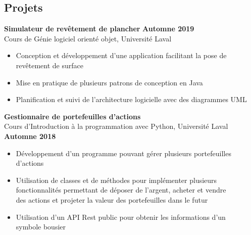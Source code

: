 \documentclass[margin,line]{resume}
\begin{document}
\begin{resume}
    \section{\mysidestyle Projets}
    \textbf{Simulateur de revêtement de plancher} \hfill \textbf{Automne 2019}
    \vspace{2mm}\\\vspace{1mm}
    Cours de Génie logiciel orienté objet, Université Laval
    \begin{itemize}
        \item Conception et développement d'une application facilitant la pose de
        \\    revêtement de surface
        \item Mise en pratique de plusieurs patrons de conception en Java
        \item Planification et suivi de l'architecture logicielle avec des diagrammes UML
    \end{itemize}
    
    
    \textbf{Gestionnaire de portefeuilles d'actions} 
    \vspace{2mm}\\\vspace{1mm}
    Cours d'Introduction à la programmation avec Python, Université Laval \hfill \textbf{Automne 2018}
    \begin{itemize}[nosep]
        \item Développement d'un programme pouvant gérer plusieurs portefeuilles 
        \\    d'actions
        \item Utilisation de classes et de méthodes pour implémenter plusieurs 
        \\  fonctionnalités permettant de déposer de l'argent, acheter et vendre 
        \\  des actions et projeter la valeur des portefeuilles dans le futur
	    \item Utilisation d'un API Rest public pour obtenir les informations d'un 
	    \\ symbole bousier
    \end{itemize} 
    

\end{resume}
\end{document}
